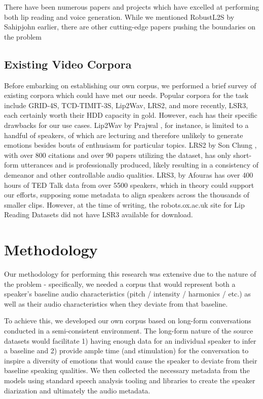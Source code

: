 \documentclass[10pt,twocolumn,letterpaper]{article}
\begin{document}
There have been numerous papers and projects which have excelled at performing both lip reading and voice generation. While we mentioned RobustL2S by Sahipjohn \etal \cite{RobustL2S} earlier, there are other cutting-edge papers pushing the boundaries on the problem  

\subsection{Existing Video Corpora}

Before embarking on establishing our own corpus, we performed a brief survey of existing corpora which could have met our needs. Popular corpora for the task include GRID-4S, TCD-TIMIT-3S, Lip2Wav, LRS2, and more recently, LSR3, each certainly worth their HDD capacity in gold. However, each has their specific drawbacks for our use cases. Lip2Wav by Prajwal \cite{LipWavCorpus2020}, for instance, is limited to a handful of speakers, of which are lecturing and therefore unlikely to generate emotions besides bouts of enthusiasm for particular topics.  LRS2 by Son Chung \cite{LipCorpus2017}, with over 800 citations and over 90 papers utilizing the dataset, has only short-form utterances and is professionally produced, likely resulting in a consistency of demeanor and other controllable audio qualities. LRS3, by Afouras \cite{LSR3} has over 400 hours of TED Talk data from over 5500 speakers, which in theory could support our efforts, supposing some metadata to align speakers across the thousands of smaller clips. However, at the time of writing, the robots.ox.ac.uk site for Lip Reading Datasets did not have LSR3 available for download. 

\section{Methodology}
\label{sec:methodology}

Our methodology for performing this research was extensive due to the nature of the problem - specifically, we needed a corpus that would represent both a speaker's baseline audio characteristics (pitch / intensity / harmonics / etc.) as well as their audio characteristics when they deviate from that baseline. 

To achieve this, we developed our own corpus based on long-form conversations conducted in a semi-consistent environment. The long-form nature of the source datasets would facilitate 1) having enough data for an individual speaker to infer a baseline and 2) provide ample time (and stimulation) for the conversation to inspire a diversity of emotions that would cause the speaker to deviate from their baseline speaking qualities. We then collected the necessary metadata from the models using standard speech analysis tooling and libraries to create the speaker diarization and ultimately the audio metadata. 
\end{document}
